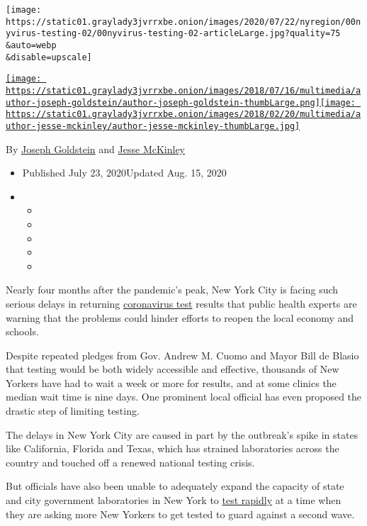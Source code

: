 \texttt{[image: https://static01.graylady3jvrrxbe.onion/images/2020/07/22/nyregion/00nyvirus-testing-02/00nyvirus-testing-02-articleLarge.jpg?quality=75\\\&auto=webp\\\&disable=upscale]}

\href{https://www.nytimes3xbfgragh.onion/by/joseph-goldstein}{\texttt{[image: https://static01.graylady3jvrrxbe.onion/images/2018/07/16/multimedia/author-joseph-goldstein/author-joseph-goldstein-thumbLarge.png]}}\href{https://www.nytimes3xbfgragh.onion/by/jesse-mckinley}{\texttt{[image: https://static01.graylady3jvrrxbe.onion/images/2018/02/20/multimedia/author-jesse-mckinley/author-jesse-mckinley-thumbLarge.jpg]}}

By \href{https://www.nytimes3xbfgragh.onion/by/joseph-goldstein}{Joseph
Goldstein} and
\href{https://www.nytimes3xbfgragh.onion/by/jesse-mckinley}{Jesse
McKinley}

\begin{itemize}
\item
  Published July 23, 2020Updated Aug. 15, 2020
\item
  \begin{itemize}
  \item
  \item
  \item
  \item
  \item
  \end{itemize}
\end{itemize}

Nearly four months after the pandemic's peak, New York City is facing
such serious delays in returning
\href{https://www.nytimes3xbfgragh.onion/2020/08/15/us/coronavirus-testing-decrease.html}{coronavirus
test} results that public health experts are warning that the problems
could hinder efforts to reopen the local economy and schools.

Despite repeated pledges from Gov. Andrew M. Cuomo and Mayor Bill de
Blasio that testing would be both widely accessible and effective,
thousands of New Yorkers have had to wait a week or more for results,
and at some clinics the median wait time is nine days. One prominent
local official has even proposed the drastic step of limiting testing.

The delays in New York City are caused in part by the outbreak's spike
in states like California, Florida and Texas, which has strained
laboratories across the country and touched off a renewed national
testing crisis.

But officials have also been unable to adequately expand the capacity of
state and city government laboratories in New York to
\href{https://www.nytimes3xbfgragh.onion/2020/08/06/health/rapid-Covid-tests.html}{test
rapidly} at a time when they are asking more New Yorkers to get tested
to guard against a second wave.


